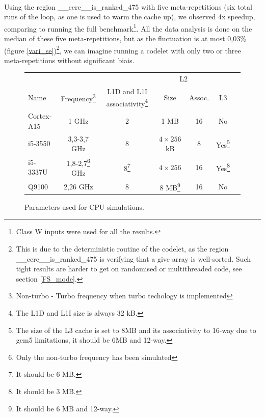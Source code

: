 \documentclass{article}
\begin{document}
\begin{multicols}{2}
\paragraph{}
Using the region \_\_cere\_\_is\_ranked\_475 with five meta-repetitions (six total runs of the loop, as one is used to warm the cache up), we observed 4x speedup, comparing to running the full benchmark\footnote{Class W inputs were used for all the results.}. All the data analysis is done on the median of these five meta-repetitions, but as the fluctuation is at most 0,03\% (figure \ref{vari_se})\footnote{This is due to the deterministic routine of the codelet, as the region \_\_cere\_\_is\_ranked\_475 is verifying that a give array is well-sorted. Such tight results are harder to get on randomised or multithreaded code, see section \ref{FS_mode}.}, we can imagine running a codelet with only two or three meta-repetitions without significant biais.


\end{multicols}
\begin{figure}[ht]
\begin{center}

\begin{tabular}{| l | c | c | c | c | c | c |}
\hline 
& & & \multicolumn{2}{c|}{L2} &\\
Name & Frequency\footnote{Non-turbo - Turbo frequency when turbo techology is implemented} & L1D and L1I associativity\footnote{The L1D and L1I size is always 32 kB.} & Size & Assoc. & L3 \\
\hline

Cortex-A15 & 1 GHz & 2 & 1 MB & 16 & No \\

i5-3550 & 3,3-3,7 GHz & 8 & $4 \times 256$ kB & 8 & Yes\footnote{The size of the L3 cache is set to 8MB and its associativity to 16-way due to gem5 limitations, it should be 6MB and 12-way.}\\

i5-3337U & 1,8-2,7\footnote{Only the non-turbo frequency has been simulated} GHz & 8\footnote{It should be 6 MB.} & $4 \times 256$ & 16 & Yes\footnote{It should be 3 MB.}\\

Q9100 & 2,26 GHz & 8 & 8 MB\footnote{It should be 6 MB and 12-way.} & 16 & No\\



\hline

\end{tabular}
\caption{\label{cpu_setup}Parameters used for CPU simulations.}
\end{center}
\end{figure}
\end{document}
